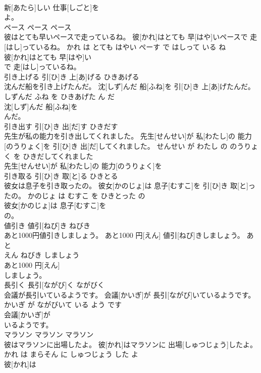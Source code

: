 \documentclass[8pt]{extreport}
\begin{document}
\begin{CJK}{UTF8}{min}
\\	新[あたら]しい 仕事[しごと]を
\\	よ。			
\\	ペース	ペース	ペース	
\\	彼はとても早いペースで走っているね。	彼[かれ]はとても 早[はや]いペースで 走[はし]っているね。	かれ は とても はやい ぺーす で はしって いる ね	
\\	彼[かれ]はとても 早[はや]い
\\	で 走[はし]っているね。			
\\	引き上げる	引[ひ]き 上[あ]げる	ひきあげる	
\\	沈んだ船を引き上げたんだ。	沈[しず]んだ 船[ふね]を 引[ひ]き 上[あ]げたんだ。	しずんだ ふね を ひきあげた ん だ	
\\	沈[しず]んだ 船[ふね]を
\\	んだ。			
\\	引き出す	引[ひ]き 出[だ]す	ひきだす	
\\	先生が私の能力を引き出してくれました。	先生[せんせい]が 私[わたし]の 能力[のうりょく]を 引[ひ]き 出[だ]してくれました。	せんせい が わたし の のうりょく を ひきだしてくれました	
\\	先生[せんせい]が 私[わたし]の 能力[のうりょく]を
\\	引き取る	引[ひ]き 取[と]る	ひきとる	
\\	彼女は息子を引き取ったの。	彼女[かのじょ]は 息子[むすこ]を 引[ひ]き 取[と]ったの。	かのじょ は むすこ を ひきとった の	
\\	彼女[かのじょ]は 息子[むすこ]を
\\	の。			
\\	値引き	値引[ねび]き	ねびき	
\\	あと1000円値引きしましょう。	あと1000 円[えん] 値引[ねび]きしましょう。	あと 
\\	えん ねびき しましょう	
\\	あと1000 円[えん]
\\	しましょう。			
\\	長引く	長引[ながび]く	ながびく	
\\	会議が長引いているようです。	会議[かいぎ]が 長引[ながび]いているようです。	かいぎ が ながびいて いる よう です	
\\	会議[かいぎ]が
\\	いるようです。			
\\	マラソン	マラソン	マラソン	
\\	彼はマラソンに出場したよ。	彼[かれ]はマラソンに 出場[しゅつじょう]したよ。	かれ は まらそん に しゅつじょう した よ	
\\	彼[かれ]は

\end{CJK}
\end{document}
